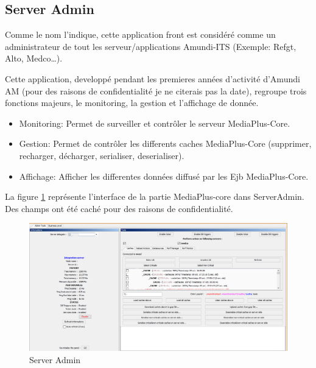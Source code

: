 \subsection{Server Admin}
\par Comme le nom l'indique, cette application front est considéré comme un administrateur de tout les serveur/applications Amundi-ITS (Exemple: Refgt, Alto, Medco\dots).
\par Cette application, developpé pendant les premieres années d'activité d'Amundi AM (pour des raisons de confidentialité je ne citerais pas la date), regroupe trois fonctions majeurs, le monitoring, la gestion et l'affichage de donnée.
\begin{itemize}
    \item Monitoring: Permet de surveiller et contrôler le serveur MediaPlus-Core.
    \item Gestion: Permet de contrôler les differents caches MediaPlus-Core (supprimer, recharger, décharger, serialiser, deserialiser).
    \item Affichage: Afficher les differentes données diffusé par les Ejb MediaPlus-Core.
\end{itemize}
\par La figure \ref{fig:serveradmin} représente l'interface de la partie MediaPlus-core dans ServerAdmin. Des champs ont été caché pour des raisons de confidentialité.
\begin{figure}[ht]
    \centering
    \includegraphics[width=\columnwidth]{img/serveradmin.png}
    \caption{Server Admin}
    \label{fig:serveradmin}
\end{figure}

